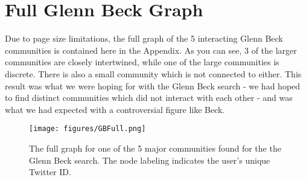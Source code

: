 \appendix   
\section{Full Glenn Beck Graph}
Due to page size limitations, the full graph of the 5 interacting Glenn Beck communities is contained here in the Appendix.  As you can see, 3 of the larger communities are closely intertwined, while one of the large communities is discrete.  There is also a small community which is not connected to either.  This result was what we were hoping for with the Glenn Beck search - we had hoped to find distinct communities which did not interact with each other - and was what we had expected with a controversial figure like Beck.
\begin{figure}
  \begin{center}
  \texttt{[image: figures/GBFull.png]}
  \end{center}
  \caption{The full graph for one of the 5 major communities found for the the Glenn Beck search.  The node labeling indicates the user's unique Twitter ID.}
  \label{figure:gbAppend}
\end{figure}
